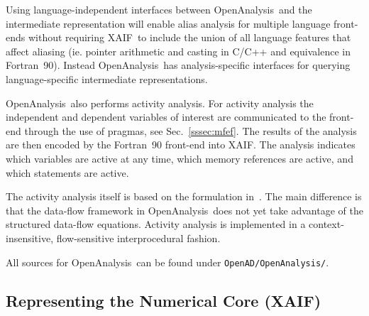 \documentclass{book}
\newcommand{\OpenAnalysis}{OpenAnalysis}
\newcommand{\xaif}{XAIF}
\newcommand{\code}[1]{{\small\tt{#1}}}
\newcommand{\refsec}[1]{{Sec.~\ref{#1}}}
\begin{document}
Using language-independent interfaces between \OpenAnalysis\ and the
intermediate representation will enable alias analysis for multiple
language front-ends without requiring \xaif\ to include the union of
all language features that affect aliasing (ie. pointer arithmetic and
casting in C/C++ and equivalence in Fortran~90).  Instead
\OpenAnalysis\ has analysis-specific interfaces for querying
language-specific intermediate representations.

\OpenAnalysis\ also performs activity analysis.  For activity analysis
the independent and dependent variables of interest are communicated
to the front-end through the use of pragmas, see \refsec{sssec:mfef}.
The results of the analysis are then encoded by the Fortran~90
front-end into \xaif.  The analysis indicates which variables are
active at any time, which memory references are active, and which
statements are active.

The activity analysis itself is based on the formulation in~\cite{HNP02}.
The main difference is that the data-flow framework in \OpenAnalysis\ does not
yet take advantage of the structured data-flow equations.  Activity analysis is
implemented in a context-insensitive, flow-sensitive interprocedural fashion.

All sources for \OpenAnalysis\ can be found under \code{OpenAD/OpenAnalysis/}.

\subsection{Representing the Numerical Core (\xaif)} \label{ssec:xaif}
\end{document}
